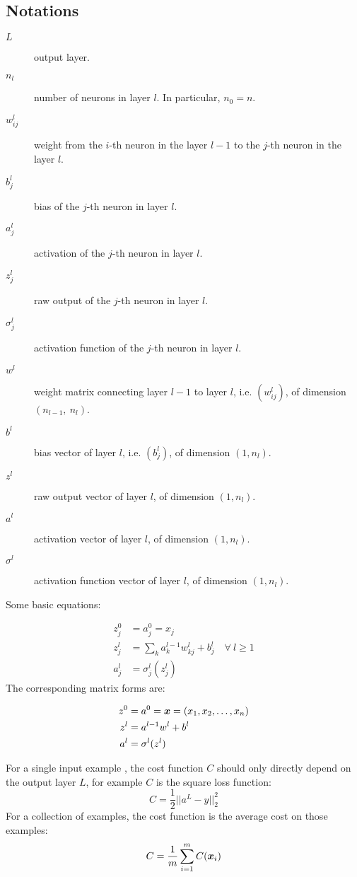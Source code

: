 \subsection{Notations}
\begin{description}
    \item[$L$] output layer.
    \item[$n_l$] number of neurons in layer $l$. In particular, $n_0 = n$.
    \item[$w^l_{ij}$] weight from the $i$-th neuron in the layer $l-1$ to the $j$-th neuron in the layer $l$.
    \item[$b^l_j$] bias of the $j$-th neuron in layer $l$.
    \item[$a^l_j$] activation of the $j$-th neuron in layer $l$.
    \item[$z^l_j$] raw output of the $j$-th neuron in layer $l$.
    \item[$\sigma^l_j$] activation function of the $j$-th neuron in layer $l$.
    \item[$w^l$] weight matrix connecting layer $l-1$ to layer $l$, i.e. $(w^l_{ij})$, of dimension 
    $(n_{l-1},\ n_l)$.
    \item[$b^l$] bias vector of layer $l$, i.e. $(b^l_j)$, of dimension $(1, n_l)$.
    \item[$z^l$] raw output vector of layer $l$, of dimension $(1, n_l)$.
    \item[$a^l$] activation vector of layer $l$, of dimension $(1, n_l)$.
    \item[$\sigma^l$] activation function vector of layer $l$, of dimension $(1, n_l)$.
\end{description}

Some basic equations:

\begin{align}
    z^0_j &= a^0_j = x_j\\
    z^l_j &= \sum_k a^{l-1}_{k} w^l_{kj} + b^l_j\quad\forall~l\geq 1\\
    a^l_j &= \sigma^l_j(z^l_j)
\end{align}
The corresponding matrix forms are:

\begin{align}
    z^0 &= a^0 = \boldsymbol{x} = (x_1, x_2, \ldots, x_{n})\\
    z^l &= a^{l-1} w^l + b^l\\
    a^l &= \sigma^l(z^l)
\end{align}

For a single input example , the cost function $C$ should only directly depend on the output layer $L$,
for example $C$ is the square loss function:
\begin{equation}\label{nn_square_loss}
    C = \frac{1}{2} ||a^L - y||^2_2
\end{equation}
For a collection of examples, the cost function is the average cost on those examples:
\begin{equation}
    C = \frac{1}{m} \sum_{i=1}^m C(\boldsymbol{x}_i)
\end{equation}

